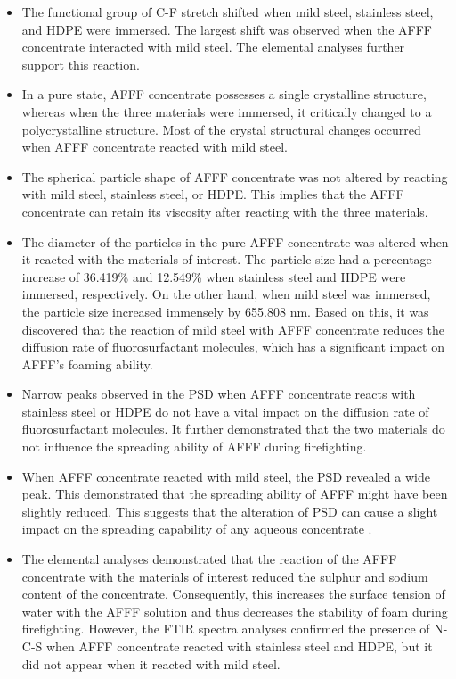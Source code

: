 \documentclass[12pt]{report}
\begin{document}
\begin{itemize}
    \item The functional group of C-F stretch shifted when mild steel, stainless steel, and HDPE were immersed. The largest shift was observed when the AFFF concentrate interacted with mild steel. The elemental analyses further support this reaction.
    \item In a pure state, AFFF concentrate possesses a single crystalline structure, whereas when the three materials were immersed, it critically changed to a polycrystalline structure. Most of the crystal structural changes occurred when AFFF concentrate reacted with mild steel. 
    \item The spherical particle shape of AFFF concentrate was not altered by reacting with mild steel, stainless steel, or HDPE. This implies that the AFFF concentrate can retain its viscosity after reacting with the three materials.
    \item The diameter of the particles in the pure AFFF concentrate was altered when it reacted with the materials of interest. The particle size had a percentage increase of 36.419\% and 12.549\% when stainless steel and HDPE were immersed, respectively. On the other hand, when mild steel was immersed, the particle size increased immensely by 655.808 nm. Based on this, it was discovered that the reaction of mild steel with AFFF concentrate reduces the diffusion rate of fluorosurfactant molecules, which has a significant impact on AFFF's foaming ability. 
    \item Narrow peaks observed in the PSD when AFFF concentrate reacts with stainless steel or HDPE do not have a vital impact on the diffusion rate of fluorosurfactant molecules. It further demonstrated that the two materials do not influence the spreading ability of AFFF during firefighting.
    \item When AFFF concentrate reacted with mild steel, the PSD revealed a wide peak. This demonstrated that the spreading ability of AFFF might have been slightly reduced. This suggests that the alteration of PSD can cause a slight impact on the spreading capability of any aqueous concentrate \cite{machhi2021effect}.
    \item The elemental analyses demonstrated that the reaction of the AFFF concentrate with the materials of interest reduced the sulphur and sodium content of the concentrate. Consequently, this increases the surface tension of water with the AFFF solution and thus decreases the stability of foam during firefighting. However, the FTIR spectra analyses confirmed the presence of N-C-S when AFFF concentrate reacted with stainless steel and HDPE, but it did not appear when it reacted with mild steel.

\end{itemize}
\end{document}

